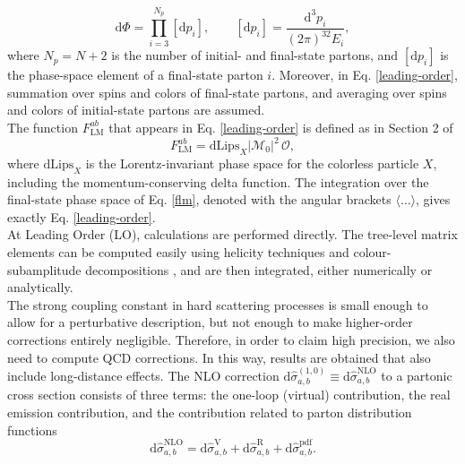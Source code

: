 \documentclass[a4paper, 12pt]{book}
\begin{document}
\begin{equation}
    \mathrm{d}\Phi=\prod_{i=3}^{N_p} [\mathrm{d}p_i], \qquad [\mathrm{d}p_i]=\frac{\mathrm{d}^3p_i}{(2\pi)^32E_i},
\end{equation}
where $N_p=N+2$ is the number of initial- and final-state partons, and $[\mathrm{d}p_i]$ is the phase-space element of a final-state parton $i$. Moreover, in Eq. \ref{leading-order}, summation over spins and colors of final-state partons, and averaging over spins and colors of initial-state partons are assumed.  \\
The function $F^{ab}_{\mathrm{LM}}$ that appears in Eq. \ref{leading-order} is defined as in Section 2 of \cite{Devoto:2023rpv}
\begin{equation}
    F^{ab}_{\mathrm{LM}} = \mathrm{dLips}_X |\mathcal{M}_0|^2 \, \mathcal{O},
    \label{flm}
\end{equation}
where $\mathrm{dLips}_X$ is the Lorentz-invariant phase space for the colorless particle $X$, including the momentum-conserving delta function. The integration over the final-state phase space of Eq. \ref{flm}, denoted with the angular brackets $\langle\dots\rangle$, gives exactly Eq. \ref{leading-order}. \\
At Leading Order (LO), calculations are performed directly. The tree-level matrix elements can be computed easily using helicity techniques and colour-subamplitude decompositions \cite{Altarelli:1977zs}, and are then integrated, either numerically or analytically. \\
The strong coupling constant in hard scattering processes is small enough to allow for a perturbative description, but not enough to make higher-order corrections entirely negligible. Therefore, in order to claim high precision, we also need to compute QCD corrections. In this way, results are obtained that also include long-distance effects.  
The NLO correction $\text{d} \hat{\sigma}_{a,b}^{(1,0)} \equiv \text{d} \hat{\sigma}_{a,b}^{\mathrm{NLO}} $ to a partonic cross section consists of three terms: the one-loop (virtual) contribution, the real emission contribution, and the contribution related to parton distribution functions
\begin{equation}
    \mathrm{d} \hat{\sigma}_{a,b}^{\mathrm{NLO}} = \mathrm{d} \hat{\sigma}_{a,b}^{\mathrm{V}} + \mathrm{d} \hat{\sigma}_{a,b}^{\mathrm{R}} + \mathrm{d} \hat{\sigma}_{a,b}^{\mathrm{pdf}}.
\end{equation} 
\end{document}
